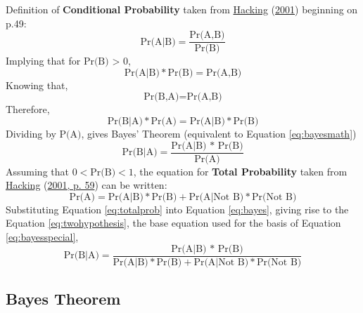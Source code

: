 \documentclass[12pt,twoside]{reedthesis}
\begin{document}
Definition of \textbf{Conditional Probability} taken from \protect\hyperlink{ref-hackingIntroductionProbabilityInductive2001}{Hacking} (\protect\hyperlink{ref-hackingIntroductionProbabilityInductive2001}{2001}) beginning on p.49:
\begin{equation}
\text{Pr(A|B)}= \frac{\text{Pr(A,B)}}{\text{Pr(B)}} 
\label{eq:conditionalprob}
\end{equation}
Implying that for \(\text{Pr(B) > 0}\),
\begin{equation}
\text{Pr(A|B)} * \text{Pr(B)} = \text{Pr(A,B)}  
\label{eq:conditionalprobproof1}
\end{equation}
Knowing that,
\begin{equation}
\text{Pr(B,A)} = \text{Pr(A,B)} 
\label{eq:conditionalprobproof2}
\end{equation}
Therefore,
\begin{equation}
\text{Pr(B|A)} * \text{Pr(A)} = \text{Pr(A|B)} * \text{Pr(B)} 
\label{eq:conditionalprobproof3}
\end{equation}
Dividing by \(\text{P(A)}\), gives Bayes' Theorem (equivalent to Equation \eqref{eq:bayesmath})
\begin{equation}
\text{Pr(B|A)}= \frac{\text{Pr(A|B) * Pr(B)}}{\text{Pr(A)}} 
\label{eq:bayes}
\end{equation}
Assuming that \(0 < \text{Pr(B)} < 1\), the equation for \textbf{Total Probability} taken from \protect\hyperlink{ref-hackingIntroductionProbabilityInductive2001}{Hacking} (\protect\hyperlink{ref-hackingIntroductionProbabilityInductive2001}{2001, p. 59}) can be written:
\begin{equation}
\text{Pr(A)} = \text{Pr(A|B)} * \text{Pr(B)} + \text{Pr(A|Not B)} * \text{Pr(Not B)}
\label{eq:totalprob}
\end{equation}
Substituting Equation \eqref{eq:totalprob} into Equation \eqref{eq:bayes}, giving rise to the Equation \eqref{eq:twohypothesis}, the base equation used for the basis of Equation \eqref{eq:bayesspecial},
\begin{equation}
\text{Pr(B|A)}= \frac{\text{Pr(A|B) * Pr(B)}}{\text{Pr(A|B)} * \text{Pr(B)} + \text{Pr(A|Not B)} * \text{Pr(Not B)}} 
\label{eq:twohypothesis}
\end{equation}
\hypertarget{bayesthe}{%
\subsection{Bayes Theorem}\label{bayesthe}}
\end{document}
